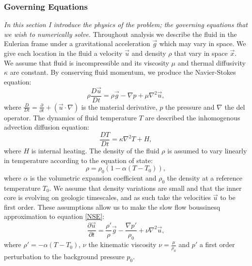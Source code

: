 \documentclass{article}
\begin{document}
\subsubsection*{Governing Equations}
{\it{In this section I introduce the physics of the problem; the governing equations that we wish to numerically solve.}}
\vspace{0.3cm}
\newline
\noindent Throughout analysis we describe the fluid in the Eulerian frame under a gravitational acceleration $\vec{g}$ which may vary in space. We give each location in the fluid a velocity $\vec{u}$ and density $\rho$ that vary in space $\vec{x}$. We assume that fluid is incompressible and its viscosity $\mu$ and thermal diffusivity $\kappa$ are constant. By conserving fluid momentum, we produce the Navier-Stokes equation:
\begin{equation}
	\rho \frac{D \vec{u}}{D t} = \rho \vec{g} - \nabla p + \mu \nabla^2 \vec{u},
	\label{NSE}
\end{equation}
where $\frac{D}{D t} = \frac{\partial }{\partial t} + (\vec{u} \cdot \nabla)$ is the material derivative, $p$ the pressure and $\nabla$ the del operator. The dynamics of fluid temperature $T$ are described the inhomogenous advection diffusion equation:
\begin{equation}
	\frac{D T}{D t} = \kappa \nabla^2 T + H,
	\label{adeT}
\end{equation}
where $H$ is internal heating. The density of the fluid $\rho$ is assumed to vary linearly in temperature according to the equation of state:
\begin{equation}
	\rho = \rho_0 (1- \alpha(T - T_0)),
	\label{equation of state}
\end{equation}
where $\alpha$ is the volumetric expansion coefficient and $\rho_0$ the density at a reference temperature $T_0$. We assume that density variations are small and that the inner core is evolving on geologic timescales, and as such take the velocities $\vec{u}$ to be first order. These assumptions allow us to make the slow flow boussinesq approximation to equation \ref{NSE}:
\begin{equation}
	\frac{\partial \vec{u}}{\partial t} = \frac{\rho'}{\rho} \vec{g} -   \frac{\nabla p'}{\rho_0} + \nu \nabla^2 \vec{u},
	\label{NSE slow + boussinesq}
\end{equation}
where $\rho'=-\alpha(T - T_0)$, $\nu$ the kinematic viscosity $\nu = \frac{\mu}{\rho_0}$ and $p'$ a first order perturbation to the background pressure $p_0$. 
\newline
\end{document}
